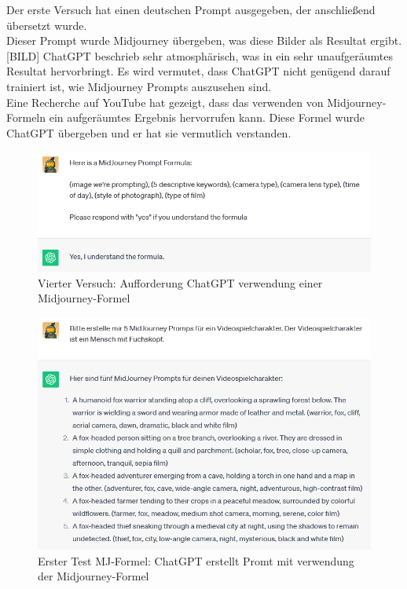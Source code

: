 \documentclass[12pt,a4paper,bibliography=totocnumbered,listof=totocnumbered]{scrartcl}
\begin{document}
Der erste Versuch hat einen deutschen Prompt ausgegeben, der anschließend übersetzt wurde.
\\
Dieser Prompt wurde Midjourney übergeben, was diese Bilder als Resultat ergibt.
[BILD]
ChatGPT beschrieb sehr atmosphärisch, was in ein sehr unaufgeräumtes Resultat hervorbringt.
Es wird vermutet, dass ChatGPT nicht genügend darauf trainiert ist, wie Midjourney Prompts auszusehen sind.
\\
Eine Recherche auf YouTube hat gezeigt, dass das verwenden von Midjourney-Formeln ein aufgeräumtes Ergebnis hervorrufen kann. Diese Formel wurde ChatGPT übergeben und er hat sie vermutlich verstanden.
\begin{figure}[h]
	\centering
	\includegraphics[scale=0.7]{BilderFuerBA/CGPTMidJourneyMartinLuther/04.png}
	\caption{Vierter Versuch: Aufforderung ChatGPT verwendung einer Midjourney-Formel}
	\label{fig:chatgpt-ptompt-Midjourney-04}
\end{figure}
\begin{figure}[h]
	\centering
	\includegraphics[scale=0.7]{BilderFuerBA/CGPTMidJourneyMartinLuther/05.png}
	\caption{Erster Test MJ-Formel: ChatGPT erstellt Promt mit verwendung der Midjourney-Formel}
	\label{fig:chatgpt-ptompt-Midjourney-05}
\end{figure}
\end{document}
